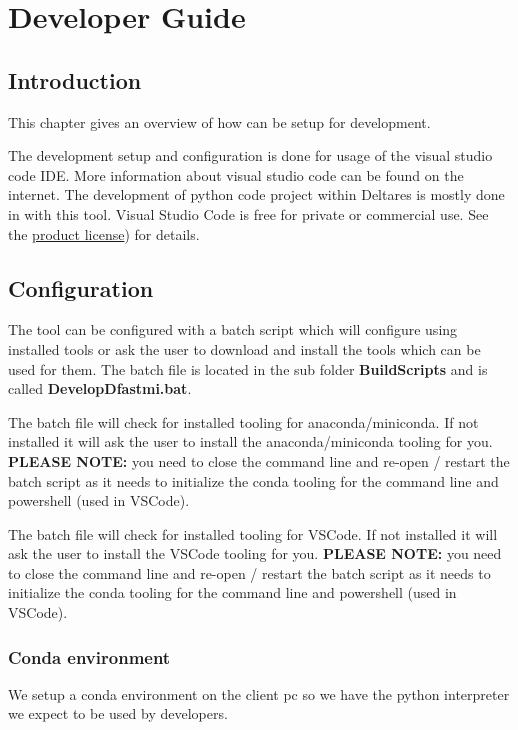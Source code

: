 \chapter{Developer Guide}

\section{Introduction}

This chapter gives an overview of how \dfastmi can be setup for development.

The development setup and configuration is done for usage of the visual studio code IDE. More information about visual studio code can be found on the internet.
The development of python code project within Deltares is mostly done in with this tool. Visual Studio Code is free for private or commercial use. See the \href{https://code.visualstudio.com/license}{product license}) for details.

\section{Configuration}
The tool can be configured with a batch script which will configure using installed tools or ask the user to download and install the tools which can be used for them. The batch file is located in the sub folder \textbf{BuildScripts} and is called \textbf{DevelopDfastmi.bat}.

The batch file will check for installed tooling for anaconda/miniconda. If not installed it will ask the user to install the anaconda/miniconda tooling for you. \textbf{PLEASE NOTE:} you need to close the command line and re-open / restart the batch script as it needs to initialize the conda tooling for the command line and powershell (used in VSCode).

The batch file will check for installed tooling for VSCode. If not installed it will ask the user to install the VSCode tooling for you. \textbf{PLEASE NOTE:} you need to close the command line and re-open / restart the batch script as it needs to initialize the conda tooling for the command line and powershell (used in VSCode).

\subsection{Conda environment}
We setup a conda environment on the client pc so we have the python interpreter we expect to be used by developers.

